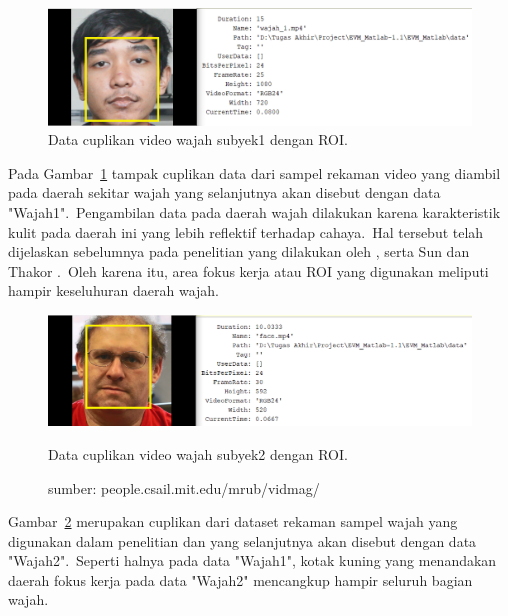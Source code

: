 \begin{figure}[ht]
	\vspace{0.5em}
	\centering
	\includegraphics[width=\textwidth]{wajah1_roi}
	\caption{Data cuplikan video wajah subyek1 dengan ROI.}
	\label{fig:wajah1}   
\end{figure}
Pada Gambar~\ref{fig:wajah1} tampak cuplikan data dari sampel rekaman video yang diambil pada daerah sekitar wajah yang selanjutnya akan disebut dengan data "Wajah1".~Pengambilan data pada daerah wajah dilakukan karena karakteristik kulit pada daerah ini yang lebih reflektif terhadap cahaya.~Hal tersebut telah dijelaskan sebelumnya pada penelitian yang dilakukan oleh \citet{Poh2010,Poh2011}, serta Sun dan Thakor \citep{sun2016}.~Oleh karena itu, area fokus kerja atau ROI yang digunakan meliputi hampir keseluhuran daerah wajah.
\newpage
\begin{figure}[ht]
	\vspace{0.5em}
	\centering
	\includegraphics[width=\textwidth]{wajah2_roi}
	\caption{Data cuplikan video wajah subyek2 dengan ROI.}
	\caption*{sumber: people.csail.mit.edu/mrub/vidmag/}
	\label{fig:wajah2}   
\end{figure}
Gambar~\ref{fig:wajah2} merupakan cuplikan dari dataset rekaman sampel wajah yang digunakan dalam penelitian \citet{Wu2012} dan \citet{RubinsteinPhDThesis2014} yang selanjutnya akan disebut dengan data "Wajah2".~Seperti halnya pada data "Wajah1", kotak kuning yang menandakan daerah fokus kerja pada data "Wajah2" mencangkup hampir seluruh bagian wajah.

